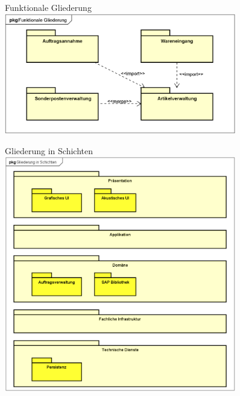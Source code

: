 \documentclass[11pt, a4paper]{article}
\begin{document}
\begin{figure}[ht]
    \centering
    \begin{minipage}[t]{0.45\textwidth}
        \centering Funktionale Gliederung \\
        \vspace{1em}
        \centering \includegraphics[width=0.9\textwidth]{Paket-00.png}
    \end{minipage}
    \centering
    \begin{minipage}[t]{0.45\textwidth}
        \centering Gliederung in Schichten \\
        \vspace{1em}
        \centering \includegraphics[width=0.9\textwidth]{Paket-01.png}
    \end{minipage}
\end{figure}
\end{document}
